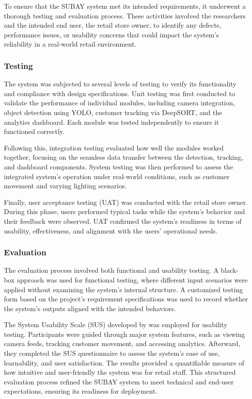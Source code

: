 {To ensure that the SUBAY system met its intended requirements, it underwent a thorough testing and evaluation process. These activities involved the researchers and the intended end user, the retail store owner, to identify any defects, performance issues, or usability concerns that could impact the system’s reliability in a real-world retail environment.

\subsubsection{Testing}

The system was subjected to several levels of testing to verify its functionality and compliance with design specifications. Unit testing was first conducted to validate the performance of individual modules, including camera integration, object detection using YOLO, customer tracking via DeepSORT, and the analytics dashboard. Each module was tested independently to ensure it functioned correctly.

Following this, integration testing evaluated how well the modules worked together, focusing on the seamless data transfer between the detection, tracking, and dashboard components. System testing was then performed to assess the integrated system's operation under real-world conditions, such as customer movement and varying lighting scenarios.

Finally, user acceptance testing (UAT) was conducted with the retail store owner. During this phase, users performed typical tasks while the system’s behavior and their feedback were observed. UAT confirmed the system’s readiness in terms of usability, effectiveness, and alignment with the users’ operational needs.

\subsubsection{Evaluation}

The evaluation process involved both functional and usability testing. A black-box approach was used for functional testing, where different input scenarios were applied without examining the system's internal structure. A customized testing form based on the project’s requirement specifications was used to record whether the system’s outputs aligned with the intended behaviors.

The System Usability Scale (SUS) developed by \cite{Brooke1995} was employed for usability testing. Participants were guided through major system features, such as viewing camera feeds, tracking customer movement, and accessing analytics. Afterward, they completed the SUS questionnaire to assess the system's ease of use, learnability, and user satisfaction. The results provided a quantifiable measure of how intuitive and user-friendly the system was for retail staff. This structured evaluation process refined the SUBAY system to meet technical and end-user expectations, ensuring its readiness for deployment.

}

